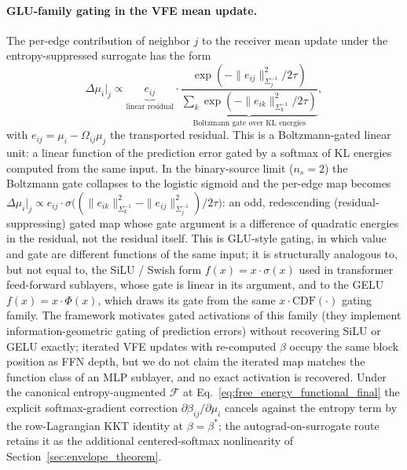 \documentclass[11pt]{article}
\begin{document}
\paragraph{GLU-family gating in the VFE mean update.}
The per-edge contribution of neighbor $j$ to the receiver mean update under the entropy-suppressed surrogate has the form
\begin{equation}
\Delta\mu_i\big|_j \propto \underbrace{e_{ij}}_{\text{linear residual}} \cdot \underbrace{\frac{\exp(-\|e_{ij}\|^2_{\Sigma_j^{-1}} / 2\tau)}{\sum_k \exp(-\|e_{ik}\|^2_{\Sigma_k^{-1}}/2\tau)}}_{\text{Boltzmann gate over KL energies}},
\label{eq:vfe_glu}
\end{equation}
with $e_{ij} = \mu_i - \Omega_{ij}\mu_j$ the transported residual. This is a Boltzmann-gated linear unit: a linear function of the prediction error gated by a softmax of KL energies computed from the same input. In the binary-source limit ($n_s = 2$) the Boltzmann gate collapses to the logistic sigmoid and the per-edge map becomes $\Delta\mu_i\big|_j \propto e_{ij}\cdot\sigma\big((\|e_{ik}\|^2_{\Sigma_k^{-1}} - \|e_{ij}\|^2_{\Sigma_j^{-1}})/2\tau\big)$: an odd, redescending (residual-suppressing) gated map whose gate argument is a difference of quadratic energies in the residual, not the residual itself. This is GLU-style gating, in which value and gate are different functions of the same input; it is structurally analogous to, but not equal to, the SiLU / Swish form $f(x) = x\cdot\sigma(x)$ used in transformer feed-forward sublayers, whose gate is linear in its argument, and to the GELU $f(x) = x\cdot\Phi(x)$, which draws its gate from the same $x\cdot\mathrm{CDF}(\cdot)$ gating family. The framework motivates gated activations of this family (they implement information-geometric gating of prediction errors) without recovering SiLU or GELU exactly; iterated VFE updates with re-computed $\beta$ occupy the same block position as FFN depth, but we do not claim the iterated map matches the function class of an MLP sublayer, and no exact activation is recovered. Under the canonical entropy-augmented $\mathcal{F}$ at Eq.~\eqref{eq:free_energy_functional_final} the explicit softmax-gradient correction $\partial\beta_{ij}/\partial\mu_i$ cancels against the entropy term by the row-Lagrangian KKT identity at $\beta = \beta^*$; the autograd-on-surrogate route retains it as the additional centered-softmax nonlinearity of Section~\ref{sec:envelope_theorem}.
\end{document}
